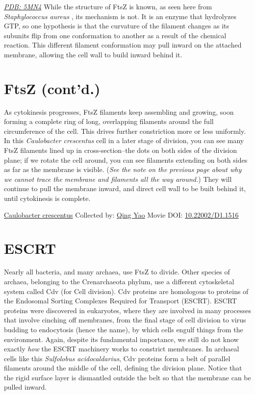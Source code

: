 \documentclass[]{tufte-book}
\begin{document}
\href{http://rcsb.org/structure/5MN4}{\emph{PDB: 5MN4}}
While the structure of FtsZ is known, as seen here from \emph{Staphylococcus aureus} \citep{wagstaff2017}, its mechanism is not. It is an enzyme that hydrolyzes GTP, so one hypothesis is that the curvature of the filament changes as its subunits flip from one conformation to another as a result of the chemical reaction. This different filament conformation may pull inward on the attached membrane, allowing the cell wall to build inward behind it.

\hypertarget{ftsz-contd.}{%
\section{FtsZ (cont'd.)}\label{ftsz-contd.}}

As cytokinesis progresses, FtsZ filaments keep assembling and growing, soon forming a complete ring of long, overlapping filaments around the full circumference of the cell. This drives further constriction more or less uniformly. In this \emph{Caulobacter crescentus} cell in a later stage of division, you can see many FtsZ filaments lined up in cross-section--the dots on both sides of the division plane; if we rotate the cell around, you can see filaments extending on both sides as far as the membrane is visible. (\emph{See the note on the previous page about why we cannot trace the membrane and filaments all the way around.}) They will continue to pull the membrane inward, and direct cell wall to be built behind it, until cytokinesis is complete.



\hypertarget{htmlwidget-f4d06d88ee8fdabf2164}{}

\label{fig:5-10}\protect\hyperlink{tree}{Caulobacter crescentus} Collected by: \protect\hyperlink{qing_yao}{Qing Yao} Movie DOI: \href{https://doi.org/10.22002/D1.1516}{10.22002/D1.1516}

\hypertarget{escrt}{%
\section{ESCRT}\label{escrt}}

Nearly all bacteria, and many archaea, use FtsZ to divide. Other species of archaea, belonging to the Crenarchaeota phylum, use a different cytoskeletal system called Cdv (for Cell division). Cdv proteins are homologous to proteins of the Endosomal Sorting Complexes Required for Transport (ESCRT). ESCRT proteins were discovered in eukaryotes, where they are involved in many processes that involve cinching off membranes, from the final stage of cell division to virus budding to endocytosis (hence the name), by which cells engulf things from the environment. Again, despite its fundamental importance, we still do not know exactly \emph{how} the ESCRT machinery works to constrict membranes. In archaeal cells like this \emph{Sulfolobus acidocaldarius}, Cdv proteins form a belt of parallel filaments around the middle of the cell, defining the division plane. Notice that the rigid surface layer is dismantled outside the belt so that the membrane can be pulled inward.
\end{document}
